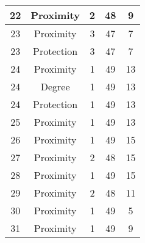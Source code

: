 \documentclass[results.tex]{subfiles}
\begin{document}
\begin{center}
\begin{tabular}{| c || c | c | c | c |}
            \hline
            22                      & Proximity                    & 2                      & 48                      & 9                    \\
            \hline
            23                      & Proximity                    & 3                      & 47                      & 7                    \\
            \hline
            23                      & Protection                   & 3                      & 47                      & 7                    \\
            \hline
            24                      & Proximity                    & 1                      & 49                      & 13                   \\
            \hline
            24                      & Degree                       & 1                      & 49                      & 13                   \\
            \hline
            24                      & Protection                   & 1                      & 49                      & 13                   \\
            \hline
            25                      & Proximity                    & 1                      & 49                      & 13                   \\
            \hline
            26                      & Proximity                    & 1                      & 49                      & 15                   \\
            \hline
            27                      & Proximity                    & 2                      & 48                      & 15                   \\
            \hline
            28                      & Proximity                    & 1                      & 49                      & 15                   \\
            \hline
            29                      & Proximity                    & 2                      & 48                      & 11                   \\
            \hline
            30                      & Proximity                    & 1                      & 49                      & 5                    \\
            \hline
            31                      & Proximity                    & 1                      & 49                      & 9                    \\

\end{tabular}
\end{center}
\end{document}
